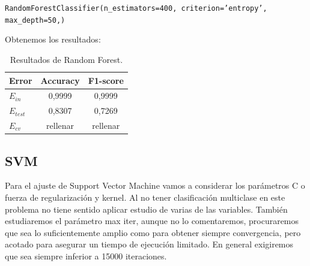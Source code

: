 \documentclass[11pt,a4paper]{article}
\begin{document}
{\begin{center}
    \texttt{RandomForestClassifier(n\_estimators=400, criterion='entropy', max\_depth=50,)}\end{center}}
    
Obtenemos los resultados:

\begin{table}[h]
\begin{center}
\begin{tabular}{|l|c|c|}
\hline
  Error & Accuracy & F1-score \\ \hline
  $E_{in}$ & 0,9999 & 0,9999 \\
  $E_{test}$ & 0,8307 & 0,7269  \\
  $E_{cv}$ & rellenar & rellenar  \\\hline
\end{tabular}
\caption{Resultados de Random Forest.}
\end{center}
\end{table}

\subsection{SVM\cite{svc}}

Para el ajuste de Support Vector Machine vamos a considerar los parámetros C o fuerza de regularización y kernel. Al no tener clasificación multiclase en este problema no tiene sentido aplicar estudio de varias de las variables. También estudiaremos el parámetro max iter, aunque no lo comentaremos, procuraremos que sea lo suficientemente amplio como para obtener siempre convergencia, pero acotado para asegurar un tiempo de ejecución limitado. En general exigiremos que sea siempre inferior a 15000 iteraciones.
\end{document}

